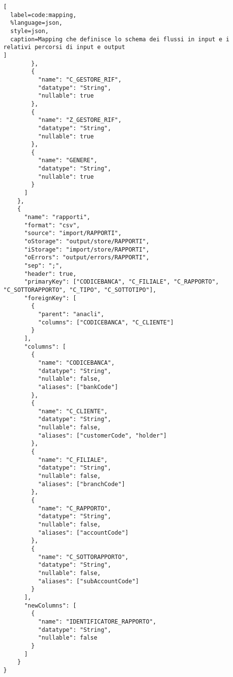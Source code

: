 \begin{lstlisting}[
  label=code:mapping,
  %language=json,
  style=json,
  caption=Mapping che definisce lo schema dei flussi in input e i relativi percorsi di input e output
]
        },
        {
          "name": "C_GESTORE_RIF",
          "datatype": "String",
          "nullable": true
        },
        {
          "name": "Z_GESTORE_RIF",
          "datatype": "String",
          "nullable": true
        },
        {
          "name": "GENERE",
          "datatype": "String",
          "nullable": true
        }
      ]
    },
    {
      "name": "rapporti",
      "format": "csv",
      "source": "import/RAPPORTI",
      "oStorage": "output/store/RAPPORTI",
      "iStorage": "import/store/RAPPORTI",
      "oErrors": "output/errors/RAPPORTI",
      "sep": ";",
      "header": true,
      "primaryKey": ["CODICEBANCA", "C_FILIALE", "C_RAPPORTO", "C_SOTTORAPPORTO", "C_TIPO", "C_SOTTOTIPO"],
      "foreignKey": [
        {
          "parent": "anacli",
          "columns": ["CODICEBANCA", "C_CLIENTE"]
        }
      ],
      "columns": [
        {
          "name": "CODICEBANCA",
          "datatype": "String",
          "nullable": false,
          "aliases": ["bankCode"]
        },
        {
          "name": "C_CLIENTE",
          "datatype": "String",
          "nullable": false,
          "aliases": ["customerCode", "holder"]
        },
        {
          "name": "C_FILIALE",
          "datatype": "String",
          "nullable": false,
          "aliases": ["branchCode"]
        },
        {
          "name": "C_RAPPORTO",
          "datatype": "String",
          "nullable": false,
          "aliases": ["accountCode"]
        },
        {
          "name": "C_SOTTORAPPORTO",
          "datatype": "String",
          "nullable": false,
          "aliases": ["subAccountCode"]
        }
      ],
      "newColumns": [
        {
          "name": "IDENTIFICATORE_RAPPORTO",
          "datatype": "String",
          "nullable": false
        }
      ]
    }
}
\end{lstlisting}